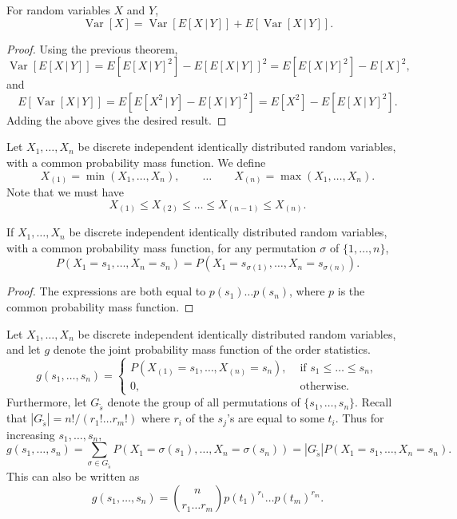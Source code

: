 \documentclass[11pt]{article}
\newcommand\E[1]{E\left[#1\right]}
\newcommand\var[1]{\operatorname{Var}[#1]}
\theoremstyle{definition}
\theoremstyle{remark}
\numberwithin{equation}{module}
\begin{document}
    \begin{theorem}
        For random variables $X$ and $Y$, \[
            \var{X} = \var{\E{X\,|\,Y}} + \E{\var{X\,|\,Y}}.
        \] 
    \end{theorem}
    \begin{proof}
        Using the previous theorem, \[
            \var{\E{X\,|\,Y}} = \E{\E{X\,|\,Y}^2} - \E{\E{X\,|\,Y}}^2 =
            \E{\E{X\,|\,Y}^2} - \E{X}^2,
        \] and \[
            \E{\var{X\,|\,Y}} = \E{\E{X^2\,|\,Y} - \E{X\,|\,Y}^2} =
            \E{X^2} - \E{\E{X\,|\,Y}^2}.
        \] Adding the above gives the desired result.
    \end{proof}

    \begin{definition}
        Let $X_1, \dots, X_n$ be discrete independent identically distributed random
        variables, with a common probability mass function. We define \[
            X_{(1)} = \min(X_1, \dots, X_n), \qquad \dots \qquad X_{(n)} =
            \max(X_1, \dots, X_n).
        \] Note that we must have \[
            X_{(1)} \leq X_{(2)} \leq \dots \leq X_{(n - 1)} \leq X_{(n)}.
        \]
    \end{definition}
    \begin{lemma}
        If $X_1, \dots, X_n$ be discrete independent identically distributed random
        variables, with a common probability mass function, for any permutation
        $\sigma$ of $\{1, \dots, n\}$, \[
            P(X_1 = s_1, \dots, X_n = s_n) = P(X_1 = s_{\sigma(1)}, \dots, X_n =
            s_{\sigma(n)}).
        \] 
    \end{lemma}
    \begin{proof}
        The expressions are both equal to $p(s_1) \dots p(s_n)$, where $p$ is the
        common probability mass function.
    \end{proof}

    \begin{theorem}
        Let $X_1, \dots, X_n$ be discrete independent identically distributed random
        variables, and let $g$ denote the joint probability mass function of the
        order statistics. \[
            g(s_1, \dots, s_n) = \begin{cases}
                P(X_{(1)} = s_1, \dots, X_{(n)} = s_n), &\text{ if }s_1 \leq \dots
                \leq s_n, \\
                0, &\text{ otherwise}.
            \end{cases}
        \] Furthermore, let $G_{\tilde{s}}$ denote the group of all permutations of
        $\{s_1, \dots, s_n\}$. Recall that $|G_{\tilde{s}}| = n! / (r_1!\dots r_m!)$
        where $r_i$ of the $s_j$'s are equal to some $t_i$. Thus for increasing
        $s_1, \dots, s_n$, \[
            g(s_1, \dots, s_n) = \sum_{\sigma \in G_{\tilde{s}}} P(X_1 =
            \sigma(s_1), \dots, X_n = \sigma(s_n)) = |G_{\tilde{s}}|P(X_1 = s_1,
            \dots, X_n = s_n).
        \] This can also be written as \[
            g(s_1, \dots, s_n) = \binom{n}{r_1 \dots r_m}p(t_1)^{r_1} \dots
            p(t_m)^{r_m}.
        \] 
    \end{theorem}
    
\end{document}

